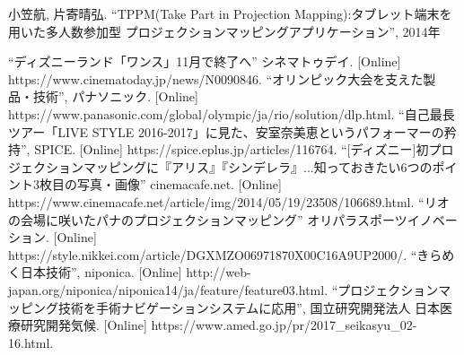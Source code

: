 \begin{thebibliography}{99}
\thispagestyle{fancy}

 小笠航, 片寄晴弘. ``TPPM(Take Part in Projection Mapping):タブレット端末を用いた多人数参加型 プロジェクションマッピングアプリケーション'', 2014年

 ``ディズニーランド「ワンス」11月で終了へ'' シネマトゥデイ. [Online] https://www.cinematoday.jp/news/N0090846.
 ``オリンピック大会を支えた製品・技術'', パナソニック. [Online]  https://www.panasonic.com/global/olympic/ja/rio/solution/dlp.html.
 ``自己最長ツアー「LIVE STYLE 2016-2017」に見た、安室奈美恵というパフォーマーの矜持'', SPICE. [Online] https://spice.eplus.jp/articles/116764.
 ``[ディズニー]初プロジェクションマッピングに『アリス』『シンデレラ』...知っておきたい6つのポイント3枚目の写真・画像'' cinemacafe.net. [Online] https://www.cinemacafe.net/article/img/2014/05/19/23508/106689.html.
 ``リオの会場に咲いたパナのプロジェクションマッピング'' オリパラスポーツイノベーション. [Online] https://style.nikkei.com/article/DGXMZO06971870X00C16A9UP2000/.
 ``きらめく日本技術'', niponica. [Online] http://web-japan.org/niponica/niponica14/ja/feature/feature03.html.
 ``プロジェクションマッピング技術を手術ナビゲーションシステムに応用'', 国立研究開発法人 日本医療研究開発気候. [Online] https://www.amed.go.jp/pr/2017\_seikasyu\_02-16.html.



\end{thebibliography}
